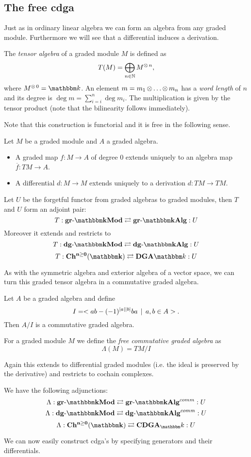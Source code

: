
\subsection{The free cdga}
\label{sec:free-cdga}

Just as in ordinary linear algebra we can form an algebra from any graded module. Furthermore we will see that a differential induces a derivation.

\begin{definition}
	The \emph{tensor algebra} of a graded module $M$ is defined as
	$$ T(M) = \bigoplus_{n\in\mathbb{N}} M^{\operatorname*{\otimes} n}, $$
	where $M^{\tensor 0} = \k$. An element $m = m_1 \operatorname*{\otimes} \ldots \operatorname*{\otimes} m_n$ has a \emph{word length} of $n$ and its degree is $\deg{m} = \sum_{i=i}^n \deg{m_i}$. The multiplication is given by the tensor product (note that the bilinearity follows immediately).
\end{definition}

Note that this construction is functorial and it is free in the following sense.

\begin{lemma}
	Let $M$ be a graded module and $A$ a graded algebra.
	\begin{itemize}
		\item A graded map $f: M \to A$ of degree $0$ extends uniquely to an algebra map $\overline{f} : TM \to A$.
		\item A differential $d: M \to M$ extends uniquely to a derivation $d: TM \to TM$.
	\end{itemize}
\end{lemma}

\begin{corollary}
	Let $U$ be the forgetful functor from graded algebras to graded modules, then $T$ and $U$ form an adjoint pair:
	$$ T: \grMod{\k} \leftadj \grAlg{\k} :U $$
	Moreover it extends and restricts to
	$$ T: \dgMod{\k} \leftadj \dgAlg{\k} :U $$
	$$ T: \CoCh{\k} \leftadj \DGA{\k} :U $$
\end{corollary}

As with the symmetric algebra and exterior algebra of a vector space, we can turn this graded tensor algebra in a commutative graded algebra.

\begin{definition}
	Let $A$ be a graded algebra and define
	$$ I = < ab - (-1)^{{|{a}|}{|{b}|}}b a \,\mid\, a,b \in A >. $$
	Then $A / I$ is a commutative graded algebra.

	For a graded module $M$ we define the \emph{free commutative graded algebra} as
	$$ \Lambda(M) = TM / I $$
\end{definition}

Again this extends to differential graded modules (i.e. the ideal is preserved by the derivative) and restricts to cochain complexes.

\begin{lemma}
	We have the following adjunctions:
	$$ \Lambda: \grMod{\k} \leftadj \grAlg{\k}^{comm} :U $$
	$$ \Lambda: \dgMod{\k} \leftadj \dgAlg{\k}^{comm} :U $$
	$$ \Lambda: \CoCh{\k} \leftadj \CDGA_\k :U $$
\end{lemma}

We can now easily construct cdga's by specifying generators and their differentials.
